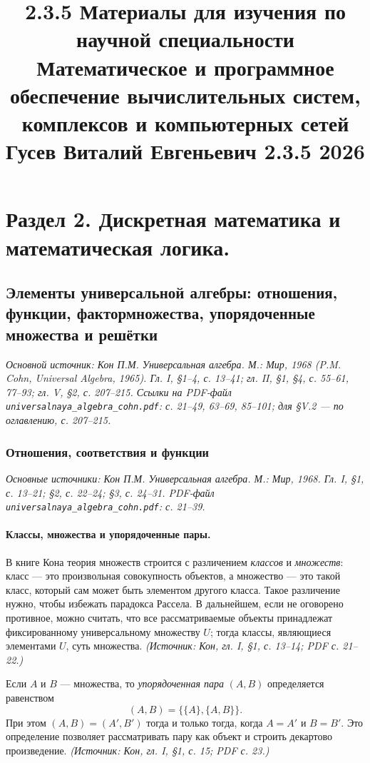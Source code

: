 \documentclass[a4paper,12pt]{article}
\title{2.3.5 Материалы для изучения по научной специальности \\
Математическое и программное обеспечение вычислительных систем, комплексов и компьютерных сетей \\
Гусев Виталий Евгеньевич 2.3.5 2026}
\date{}
\begin{document}
\maketitle

\tableofcontents
\newpage

\setcounter{section}{1} %
\section{Раздел 2. Дискретная математика и математическая логика.}

\subsection{Элементы универсальной алгебры: отношения, функции, фактормножества, упорядоченные множества и решётки}

\noindent\textit{Основной источник: Кон П.М. Универсальная алгебра. М.: Мир, 1968 (P.M. Cohn, Universal Algebra, 1965). Гл. I, §1--4, с. 13--41; гл. II, §1, §4, с. 55--61, 77--93; гл. V, §2, с. 207--215. Ссылки на PDF-файл \texttt{universalnaya\_algebra\_cohn.pdf}: с. 21--49, 63--69, 85--101; для §V.2 — по оглавлению, с. 207--215.}

\subsubsection{Отношения, соответствия и функции}

\noindent\textit{Основные источники: Кон П.М. Универсальная алгебра. М.: Мир, 1968. Гл. I, §1, с. 13--21; §2, с. 22--24; §3, с. 24--31. PDF-файл \texttt{universalnaya\_algebra\_cohn.pdf}: с. 21--39.}

\paragraph{Классы, множества и упорядоченные пары.}
В книге Кона теория множеств строится с различением \emph{классов} и \emph{множеств}: класс — это произвольная совокупность объектов, а множество — это такой класс, который сам может быть элементом другого класса. Такое различение нужно, чтобы избежать парадокса Рассела. В дальнейшем, если не оговорено противное, можно считать, что все рассматриваемые объекты принадлежат фиксированному универсальному множеству \(U\); тогда классы, являющиеся элементами \(U\), суть множества.
\textit{(Источник: Кон, гл. I, §1, с. 13--14; PDF с. 21--22.)}

Если \(A\) и \(B\) — множества, то \emph{упорядоченная пара} \((A,B)\) определяется равенством
\[
(A,B)=\bigl\{\{A\},\{A,B\}\bigr\}.
\]
При этом \((A,B)=(A',B')\) тогда и только тогда, когда \(A=A'\) и \(B=B'\). Это определение позволяет рассматривать пару как объект и строить декартово произведение.
\textit{(Источник: Кон, гл. I, §1, с. 15; PDF с. 23.)}
\end{document}
